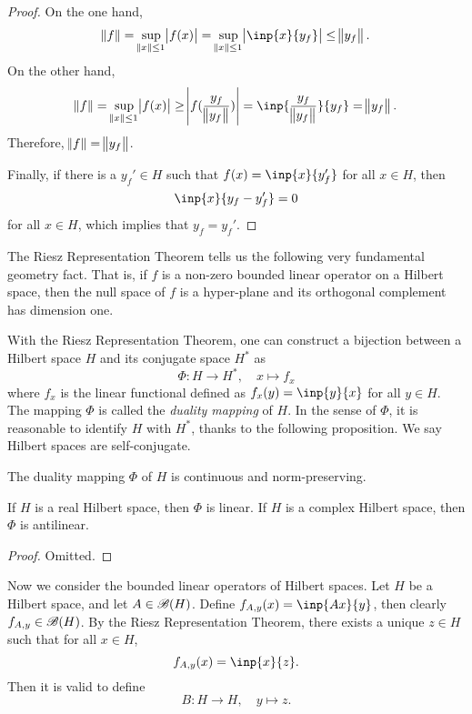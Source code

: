 \begin{proof}
On the one hand, 
\begin{equation*}
    \norm{f} = \sup_{\norm{x} \le 1} \abs{f(x)} 
    = \sup_{\norm{x} \le 1} \abs{\inp{x}{y_f}} \le \norm{y_f}.
\end{equation*}
On the other hand, 
\begin{equation*}
    \norm{f} = \sup_{\norm{x} \le 1} \abs{f(x)} 
    \ge \abs{f(\frac{y_f}{\norm{y_f}})} = \inp{\frac{y_f}{\norm{y_f}}}{y_f}
    = \norm{y_f}.
\end{equation*}
Therefore, $\norm{f} = \norm{y_f}$. 

Finally, if there is a $y_f' \in H$ such that $f(x) = \inp{x}{y_f'}$ for 
all $x \in H$, then 
\begin{equation*}
    \inp{x}{y_f - y_f'} = 0
\end{equation*}
for all $x \in H$, which implies that $y_f = y_f'$. 
\end{proof}

The Riesz Representation Theorem tells us the following very fundamental 
geometry fact. 
That is, if $f$ is a non-zero bounded linear operator on a Hilbert space, 
then the null space of $f$ is a hyper-plane and its orthogonal complement 
has dimension one. 

With the Riesz Representation Theorem, one can construct a bijection 
between a Hilbert space $H$ and its conjugate space $H^\ast$ as 
\begin{equation*}
    \Phi: H \to H^\ast, \quad x \mapsto f_x
\end{equation*}
where $f_x$ is the linear functional defined as $f_x(y) = \inp{y}{x}$ 
for all $y \in H$. 
The mapping $\Phi$ is called the \emph{duality mapping} of $H$. 
In the sense of $\Phi$, it is reasonable to identify $H$ with $H^\ast$, 
thanks to the following proposition. 
We say Hilbert spaces are self-conjugate. 

\begin{prop}
The duality mapping $\Phi$ of $H$ is continuous and norm-preserving. 

If $H$ is a real Hilbert space, then $\Phi$ is linear. 
If $H$ is a complex Hilbert space, then $\Phi$ is antilinear. 
\end{prop}
\begin{proof}
Omitted. 
\end{proof}

Now we consider the bounded linear operators of Hilbert spaces. 
Let $H$ be a Hilbert space, and let $A \in \mathscr{B}(H)$. 
Define $f_{A, y}(x) = \inp{Ax}{y}$, then clearly $f_{A, y} \in \mathscr{B}(H)$. 
By the Riesz Representation Theorem, there exists a unique $z \in H$ such 
that for all $x \in H$, 
\begin{equation*}
    f_{A, y}(x) = \inp{x}{z}. 
\end{equation*}
Then it is valid to define 
\begin{equation}
    \label{equ:hilbert_spaces:adjoint_operator:B}
    B: H \to H, \quad y \mapsto z. 
\end{equation}

